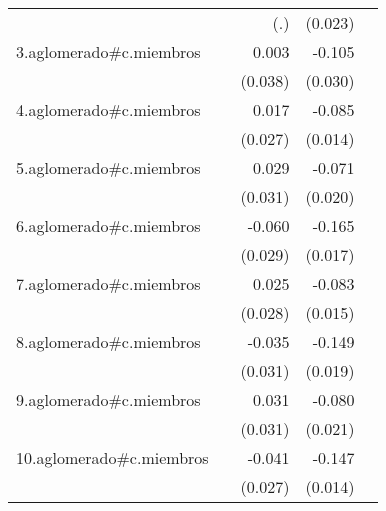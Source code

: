 {\begin{longtable}{l*{4}{D{.}{.}{-1}}}
            &                     &         (.)         &     (0.023)         &                     \\
\addlinespace
3.aglomerado#c.miembros&                     &       0.003         &      -0.105\sym{***}&                     \\
            &                     &     (0.038)         &     (0.030)         &                     \\
\addlinespace
4.aglomerado#c.miembros&                     &       0.017         &      -0.085\sym{***}&                     \\
            &                     &     (0.027)         &     (0.014)         &                     \\
\addlinespace
5.aglomerado#c.miembros&                     &       0.029         &      -0.071\sym{***}&                     \\
            &                     &     (0.031)         &     (0.020)         &                     \\
\addlinespace
6.aglomerado#c.miembros&                     &      -0.060\sym{*}  &      -0.165\sym{***}&                     \\
            &                     &     (0.029)         &     (0.017)         &                     \\
\addlinespace
7.aglomerado#c.miembros&                     &       0.025         &      -0.083\sym{***}&                     \\
            &                     &     (0.028)         &     (0.015)         &                     \\
\addlinespace
8.aglomerado#c.miembros&                     &      -0.035         &      -0.149\sym{***}&                     \\
            &                     &     (0.031)         &     (0.019)         &                     \\
\addlinespace
9.aglomerado#c.miembros&                     &       0.031         &      -0.080\sym{***}&                     \\
            &                     &     (0.031)         &     (0.021)         &                     \\
\addlinespace
10.aglomerado#c.miembros&                     &      -0.041         &      -0.147\sym{***}&                     \\
            &                     &     (0.027)         &     (0.014)         &                     \\

\end{longtable}}
